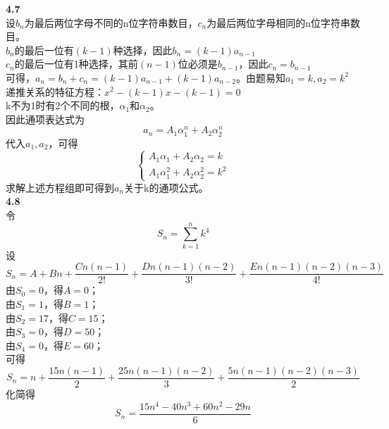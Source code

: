 \documentclass[a4paper,12pt]{article}
\begin{document}
	\noindent
	\textbf{4.7}\\
	设$b_{n}$为最后两位字母不同的n位字符串数目，$c_{n}$为最后两位字母相同的n位字符串数目。\\
	$b_{n}$的最后一位有$(k-1)$种选择，因此$b_{n}=(k-1)a_{n-1}$\\
	$c_{n}$的最后一位有1种选择，其前$(n-1)$位必须是$b_{n-1}$，因此$c_{n}=b_{n-1}$\\
	可得，$a_{n}=b_{n}+c_{n}=(k-1)a_{n-1}+(k-1)a_{n-2}$。由题易知$a_{1}=k,a_{2}=k^2$\\
	递推关系的特征方程：$x^2-(k-1)x-(k-1)=0$\\
	k不为1时有2个不同的根，$\alpha_1$和$\alpha_2$。\\
	因此通项表达式为\[
		a_{n}=A_{1}\alpha_1^{n}+A_{2}\alpha_2^{n}
	\]
	代入$a_{1},a_{2}$，可得
	$$
	\begin{cases}
		A_{1}\alpha_1+A_{2}\alpha_2=k\\
		A_{1}\alpha_1^2+A_{2}\alpha_2^2=k^2
	\end{cases}
	$$
	求解上述方程组即可得到$a_{n}$关于k的通项公式。
	\\
	
	\noindent
	\textbf{4.8}\\
	令\[
		S_{n}=\sum_{k=1}^{n}{k^{4}}
	\]
	设\[
		S_{n}=A+Bn+\frac{Cn(n-1)}{2!}+\frac{Dn(n-1)(n-2)}{3!}+\frac{En(n-1)(n-2)(n-3)}{4!}
	\]
	由$S_{0}=0$，得$A=0$；\\
	由$S_{1}=1$，得$B=1$；\\
	由$S_{2}=17$，得$C=15$；\\
	由$S_{3}=0$，得$D=50$；\\
	由$S_{4}=0$，得$E=60$；\\
	可得\[
		S_{n}=n+\frac{15n(n-1)}{2}+\frac{25n(n-1)(n-2)}{3}+\frac{5n(n-1)(n-2)(n-3)}{2}
	\]
	化简得\[
		S_{n}=\frac{15n^4-40n^3+60n^2-29n}{6}
	\]
	\\
	
\end{document}
